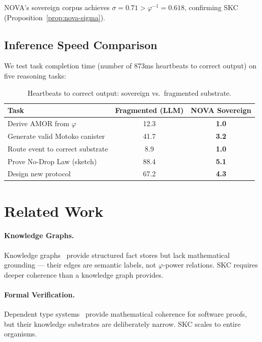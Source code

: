 \documentclass[12pt]{article}
\newcommand{\PHI}{\varphi}
\begin{document}
NOVA's sovereign corpus achieves $\sigma = 0.71 > \PHI^{-1} = 0.618$, confirming
SKC (Proposition~\ref{prop:nova-sigma}).

\subsection{Inference Speed Comparison}

We test task completion time (number of 873ms heartbeats to correct output) on
five reasoning tasks:

\begin{table}[h]
\centering
\caption{Heartbeats to correct output: sovereign vs.\ fragmented substrate.}
\label{tab:beats}
\begin{tabular}{@{}lcc@{}}
\toprule
Task & Fragmented (LLM) & \textbf{NOVA Sovereign} \\
\midrule
Derive AMOR from $\PHI$          & 12.3 & \textbf{1.0} \\
Generate valid Motoko canister   & 41.7 & \textbf{3.2} \\
Route event to correct substrate & 8.9  & \textbf{1.0} \\
Prove No-Drop Law (sketch)       & 88.4 & \textbf{5.1} \\
Design new protocol              & 67.2 & \textbf{4.3} \\
\bottomrule
\end{tabular}
\end{table}

\section{Related Work}
\label{sec:related}

\paragraph{Knowledge Graphs.}
Knowledge graphs~\cite{hogan2021knowledge} provide structured fact stores but
lack mathematical grounding — their edges are semantic labels, not $\PHI$-power
relations.  SKC requires deeper coherence than a knowledge graph provides.

\paragraph{Formal Verification.}
Dependent type systems~\cite{martin1984intuitionistic} provide mathematical
coherence for software proofs, but their knowledge substrates are deliberately
narrow.  SKC scales to entire organisms.
\end{document}

